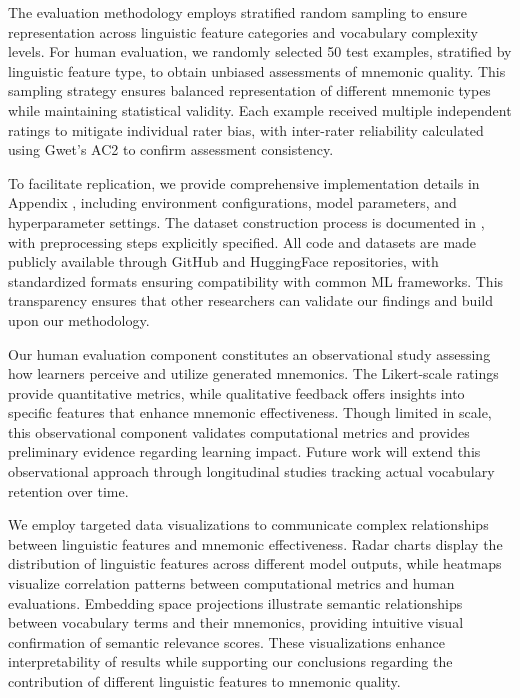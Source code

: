  The evaluation methodology employs stratified random sampling to ensure representation across linguistic feature categories and vocabulary complexity levels. For human evaluation, we randomly selected 50 test examples, stratified by linguistic feature type, to obtain unbiased assessments of mnemonic quality. This sampling strategy ensures balanced representation of different mnemonic types while maintaining statistical validity. Each example received multiple independent ratings to mitigate individual rater bias, with inter-rater reliability calculated using Gwet's AC2 to confirm assessment consistency.

 To facilitate replication, we provide comprehensive implementation details in Appendix , including environment configurations, model parameters, and hyperparameter settings. The dataset construction process is documented in , with preprocessing steps explicitly specified. All code and datasets are made publicly available through GitHub and HuggingFace repositories, with standardized formats ensuring compatibility with common ML frameworks. This transparency ensures that other researchers can validate our findings and build upon our methodology.

 Our human evaluation component constitutes an observational study assessing how learners perceive and utilize generated mnemonics. The Likert-scale ratings provide quantitative metrics, while qualitative feedback offers insights into specific features that enhance mnemonic effectiveness. Though limited in scale, this observational component validates computational metrics and provides preliminary evidence regarding learning impact. Future work will extend this observational approach through longitudinal studies tracking actual vocabulary retention over time.

 We employ targeted data visualizations to communicate complex relationships between linguistic features and mnemonic effectiveness. Radar charts display the distribution of linguistic features across different model outputs, while heatmaps visualize correlation patterns between computational metrics and human evaluations. Embedding space projections illustrate semantic relationships between vocabulary terms and their mnemonics, providing intuitive visual confirmation of semantic relevance scores. These visualizations enhance interpretability of results while supporting our conclusions regarding the contribution of different linguistic features to mnemonic quality.

